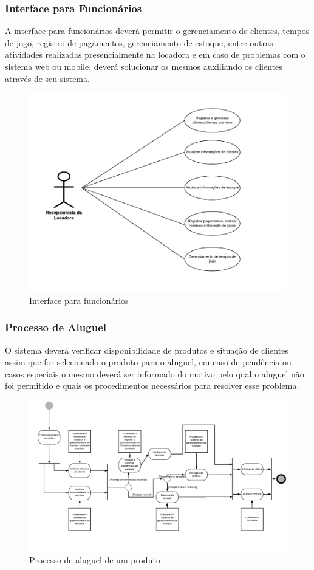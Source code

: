 \documentclass{article}
\begin{document}
         \subsubsection{Interface para Funcionários}
            A interface para funcionários deverá permitir o gerenciamento de clientes, tempos de jogo, registro de pagamentos, gerenciamento de estoque, entre outras atividades realizadas presencialmente na locadora e em caso de problemas com o sistema web ou mobile, deverá solucionar os mesmos auxiliando os clientes através de seu sistema.
            \begin{figure}[H]
                \label{fig: Diagrama de Casos de Uso}
                \centering
                \includegraphics[width=.8\textwidth]{pictures/cduso.PNG} 
                \caption{Interface para funcionários}
            \end{figure}
            
             \subsubsection{Processo de Aluguel}
                O sistema deverá verificar disponibilidade de produtos e situação de clientes assim que for selecionado o produto para o aluguel, em caso de pendência ou casos especiais o mesmo deverá ser informado do motivo pelo qual o aluguel não foi permitido e quais os procedimentos necessários para resolver esse problema.
            \begin{figure}[H]
                \label{fig: Diagrama de processos} 
                \centering
                \includegraphics[width=.8\textwidth]{pictures/aluguel.PNG} 
                \caption{Processo de aluguel de um produto}
            \end{figure}
            
\end{document}
